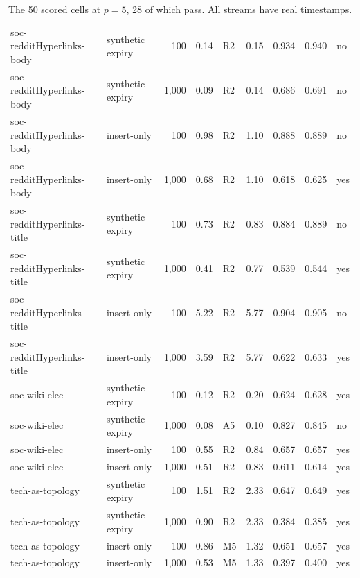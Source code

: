 \begin{table}[p]
\begin{tabular}{llrrlrrrl}
soc-redditHyperlinks-body & synthetic expiry & 100 & 0.14 & R2 & 0.15 & 0.934 & 0.940 & no \\
soc-redditHyperlinks-body & synthetic expiry & 1,000 & 0.09 & R2 & 0.14 & 0.686 & 0.691 & no \\
soc-redditHyperlinks-body & insert-only & 100 & 0.98 & R2 & 1.10 & 0.888 & 0.889 & no \\
soc-redditHyperlinks-body & insert-only & 1,000 & 0.68 & R2 & 1.10 & 0.618 & 0.625 & yes \\
soc-redditHyperlinks-title & synthetic expiry & 100 & 0.73 & R2 & 0.83 & 0.884 & 0.889 & no \\
soc-redditHyperlinks-title & synthetic expiry & 1,000 & 0.41 & R2 & 0.77 & 0.539 & 0.544 & yes \\
soc-redditHyperlinks-title & insert-only & 100 & 5.22 & R2 & 5.77 & 0.904 & 0.905 & no \\
soc-redditHyperlinks-title & insert-only & 1,000 & 3.59 & R2 & 5.77 & 0.622 & 0.633 & yes \\
soc-wiki-elec & synthetic expiry & 100 & 0.12 & R2 & 0.20 & 0.624 & 0.628 & yes \\
soc-wiki-elec & synthetic expiry & 1,000 & 0.08 & A5 & 0.10 & 0.827 & 0.845 & no \\
soc-wiki-elec & insert-only & 100 & 0.55 & R2 & 0.84 & 0.657 & 0.657 & yes \\
soc-wiki-elec & insert-only & 1,000 & 0.51 & R2 & 0.83 & 0.611 & 0.614 & yes \\
tech-as-topology & synthetic expiry & 100 & 1.51 & R2 & 2.33 & 0.647 & 0.649 & yes \\
tech-as-topology & synthetic expiry & 1,000 & 0.90 & R2 & 2.33 & 0.384 & 0.385 & yes \\
tech-as-topology & insert-only & 100 & 0.86 & M5 & 1.32 & 0.651 & 0.657 & yes \\
tech-as-topology & insert-only & 1,000 & 0.53 & M5 & 1.33 & 0.397 & 0.400 & yes \\
\hline
\end{tabular}
\caption{The 50 scored cells at $p = 5$, 28 of which pass. All streams have real timestamps.}
\label{tab:allcells}
\end{table}
